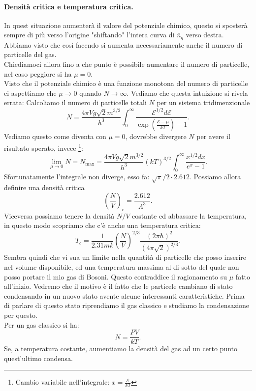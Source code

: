 \paragraph{Densità critica e temperatura critica.}
In quest situazione aumenterà il valore del potenziale chimico, questo si sposterà sempre di più verso l'origine "shiftando" l'intera curva di $\overline{n}_{q}$ verso destra. Abbiamo visto che così facendo si aumenta necessariamente anche il numero di particelle del gas.\\
Chiediamoci allora fino a che punto è possibile aumentare il numero di particelle, nel caso peggiore si ha $\mu = 0$.\\
Visto che il potenziale chimico è una funzione monotona del numero di particelle ci aspettiamo che $\mu \to 0$ quando $N\to \infty$. Vediamo che questa intuizione si rivela errata: Calcoliamo il numero di particelle totali $N$ per un sistema tridimenzionale
\[
	N = \frac{4\pi V g \sqrt{2} m ^{3 /2}}{h^3}
	\int_{0}^{\infty} \frac{\mathcal{E} ^{1 /2}d\mathcal{E} }
	{\exp\left( \frac{\mathcal{E} -\mu }{kT} \right) -1} 
.\] 
Vediamo questo come diventa con $\mu = 0$, dovrebbe divergere $N$ per avere il risultato sperato, invece \footnote{Cambio variabile nell'integrale: $x = \frac{\mathcal{E} }{kT}$}:
\[
	\lim_{\mu \to 0} N = N_{\text{max}}= \frac{4\pi V g \sqrt{2} m ^{3 /2}}{h^3} \left( kT \right)^{3 /2} \int_{0}^{\infty} \frac{x^{1 /2}dx}{e^{x}-1} \label{eq:N-critico}
.\] 
Sfortunatamente l'integrale non diverge, esso fa: $ \sqrt{\pi} /2 \cdot 2.612$. Possiamo allora definire una densità critica
\[
	\left( \frac{N}{V} \right)_{\text{c}}= \frac{2.612}{\Lambda ^3}
.\] 
Viceversa possiamo tenere la densità $N /V$ costante ed abbassare la temperatura, in questo modo scopriamo che c'è anche una temperatura critica:
\[
	T_{c} = \frac{1}{2.31 m k} \left( \frac{N}{V} \right)^{2 /3} \frac{\left( 2\pi \hbar  \right) ^2}{\left( 4\pi \sqrt{2}  \right) ^{2 /3}}
.\] 
Sembra quindi che vi sua un limite nella quantità di particelle che posso inserire nel volume disponibile, ed una temperatura massima al di sotto del quale non posso portare il mio gas di Bosoni. Questo contraddice il ragionamento su $\mu $ fatto all'inizio.
Vedremo che il motivo è il fatto che le particele cambiano di stato condensando in un nuovo stato avente alcune interessanti caratteristiche. Prima di parlare di questo stato riprendiamo il gas classico e studiamo la condensazione per questo.\\
Per un gas classico si ha:
\[
	N = \frac{PV}{kT}
.\] Se, a temperatura costante, aumentiamo la densità del gas ad un certo punto quest'ultimo condensa.\\
